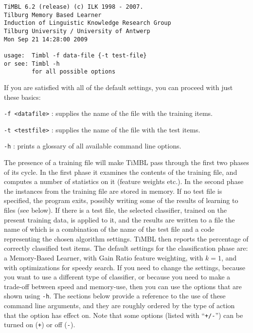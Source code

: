 \documentclass{report}
\begin{document}
{\footnotesize
\begin{verbatim}
TiMBL 6.2 (release) (c) ILK 1998 - 2007.
Tilburg Memory Based Learner
Induction of Linguistic Knowledge Research Group
Tilburg University / University of Antwerp
Mon Sep 21 14:28:00 2009

usage:  Timbl -f data-file {-t test-file}
or see: Timbl -h
        for all possible options
\end{verbatim}
}

If you are satisfied with all of the default settings, you can proceed
with just these basics:

\begin{description}

\item {\tt -f <datafile>} : supplies the name of the file with the
training items.
\item {\tt -t <testfile>} : supplies the name of the file with the
test items.
\item {\tt -h} : prints a glossary of all available command line 
options.

\end{description}

The presence of a training file will make TiMBL pass through the first two phases of its cycle. In the first phase it examines the contents of the training file, and computes a number of statistics on it (feature weights etc.). In the second phase the instances from the training file are stored in memory. If no test file is specified, the program exits, possibly writing some of the results of learning to files (see below). If there is a test file, the selected classifier, trained on the present training data, is applied to it, and the results are written to a file the name of which is a combination of the name of the test file and a code representing the chosen algorithm settings. TiMBL then reports the percentage of correctly classified test items. The default settings for the classification phase are: a Memory-Based Learner, with Gain Ratio feature weighting, with $k=1$, and with optimizations for speedy search. If you need to change the settings, because you want to use a different type of classifier, or because you need to make a trade-off between speed and memory-use, then you can use the options that are shown using {\tt -h}. The sections below provide a reference to the use of these command line arguments, and they are roughly ordered by the type of action that the option has effect on. Note that some options (listed with ``{\tt +/-}'') can be turned on ({\tt +}) or off ({\tt -}).
\end{document}
